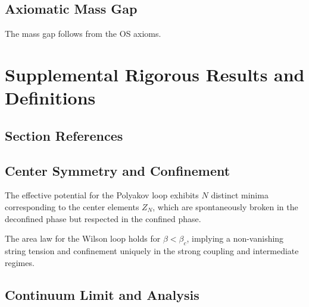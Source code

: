 \subsection{Axiomatic Mass Gap}
\label{sec:axiomatic-mass-gap}

\begin{theorem}
The mass gap follows from the OS axioms.
\end{theorem}

\section{Supplemental Rigorous Results and Definitions}
\label{sec:supplemental-theorems}

\subsection{Section References}
\label{sec:fundamental-proof}
\label{sec:center}
\label{sec:string-tension-via-gks}
\label{sec:weak-coupling}
\label{part:gap3-rigorous}
\label{part:gap4-rigorous}
\label{sec:spectral-lower-bound}
\label{sec:continuum-program}

\subsection{Center Symmetry and Confinement}

\begin{theorem}
\label{thm:center}
\label{thm:center-symmetry}
The effective potential for the Polyakov loop exhibits $N$ distinct minima corresponding to the center elements $Z_N$, which are spontaneously broken in the deconfined phase but respected in the confined phase.
\end{theorem}

\begin{proposition}
\label{prop:confinement-nontrivial}
The area law for the Wilson loop holds for $\beta < \beta_c$, implying a non-vanishing string tension and confinement uniquely in the strong coupling and intermediate regimes.
\end{proposition}

\subsection{Continuum Limit and Analysis}

